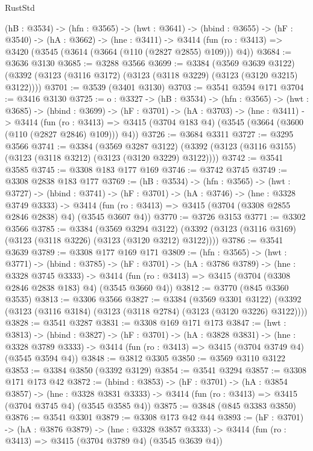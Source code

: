 \begin{lexlean}{RustStd}
\begin{coremodule}
  (hB : @3534) ->
  (hfn : @3565) ->
  (hwt : @3641) ->
  (hbind : @3655) ->
  (hF : @3540) ->
  (hA : @3662) ->
  (hne : @3411) ->
  @3414 (fun (ro : @3413) => @3420 (@3545 (@3614 (@3664 (@110 (@2827 @2855) @109))) @4))
@3684 := @3636 @3130
@3685 := @3288 @3566
@3699 := @3384
    (@3569 @3639 @3122)
    (@3392 (@3123 (@3116 @3172) (@3123 (@3118 @3229) (@3123 (@3120 @3215) @3122))))
@3701 := @3539 (@3401 @3130)
@3703 := @3541 @3594 @171
@3704 := @3416 @3130
@3725 := {o : @3327} ->
  (hB : @3534) ->
  (hfn : @3565) ->
  (hwt : @3685) ->
  (hbind : @3699) ->
  (hF : @3701) ->
  (hA : @3703) ->
  (hne : @3411) ->
  @3414
    (fun (ro : @3413) => @3415 (@3704 @183 @4) (@3545 (@3664 (@3600 (@110 (@2827 @2846) @109))) @4))
@3726 := @3684 @3311
@3727 := @3295 @3566
@3741 := @3384
    (@3569 @3287 @3122)
    (@3392 (@3123 (@3116 @3155) (@3123 (@3118 @3212) (@3123 (@3120 @3229) @3122))))
@3742 := @3541 @3585
@3745 := @3308 @183 @177 @169
@3746 := @3742 @3745
@3749 := @3308 @2838 @183 @177
@3769 := (hB : @3534) ->
  (hfn : @3565) ->
  (hwt : @3727) ->
  (hbind : @3741) ->
  (hF : @3701) ->
  (hA : @3746) ->
  (hne : @3328 @3749 @3333) ->
  @3414 (fun (ro : @3413) => @3415 (@3704 (@3308 @2855 @2846 @2838) @4) (@3545 @3607 @4))
@3770 := @3726 @3153
@3771 := @3302 @3566
@3785 := @3384
    (@3569 @3294 @3122)
    (@3392 (@3123 (@3116 @3169) (@3123 (@3118 @3226) (@3123 (@3120 @3212) @3122))))
@3786 := @3541 @3639
@3789 := @3308 @177 @169 @171
@3809 := (hfn : @3565) ->
  (hwt : @3771) ->
  (hbind : @3785) ->
  (hF : @3701) ->
  (hA : @3786 @3789) ->
  (hne : @3328 @3745 @3333) ->
  @3414 (fun (ro : @3413) => @3415 (@3704 (@3308 @2846 @2838 @183) @4) (@3545 @3660 @4))
@3812 := @3770 (@845 @3360 @3535)
@3813 := @3306 @3566
@3827 := @3384
    (@3569 @3301 @3122)
    (@3392 (@3123 (@3116 @3184) (@3123 (@3118 @2784) (@3123 (@3120 @3226) @3122))))
@3828 := @3541 @3287
@3831 := @3308 @169 @171 @173
@3847 := (hwt : @3813) ->
  (hbind : @3827) ->
  (hF : @3701) ->
  (hA : @3828 @3831) ->
  (hne : @3328 @3789 @3333) -> @3414 (fun (ro : @3413) => @3415 (@3704 @3749 @4) (@3545 @3594 @4))
@3848 := @3812 @3305
@3850 := @3569 @3110 @3122
@3853 := @3384 @3850 (@3392 @3129)
@3854 := @3541 @3294
@3857 := @3308 @171 @173 @42
@3872 := (hbind : @3853) ->
  (hF : @3701) ->
  (hA : @3854 @3857) ->
  (hne : @3328 @3831 @3333) -> @3414 (fun (ro : @3413) => @3415 (@3704 @3745 @4) (@3545 @3585 @4))
@3875 := @3848 (@845 @3383 @3850)
@3876 := @3541 @3301
@3879 := @3308 @173 @42 @44
@3893 := (hF : @3701) ->
  (hA : @3876 @3879) ->
  (hne : @3328 @3857 @3333) -> @3414 (fun (ro : @3413) => @3415 (@3704 @3789 @4) (@3545 @3639 @4))

\end{coremodule}
\end{lexlean}

